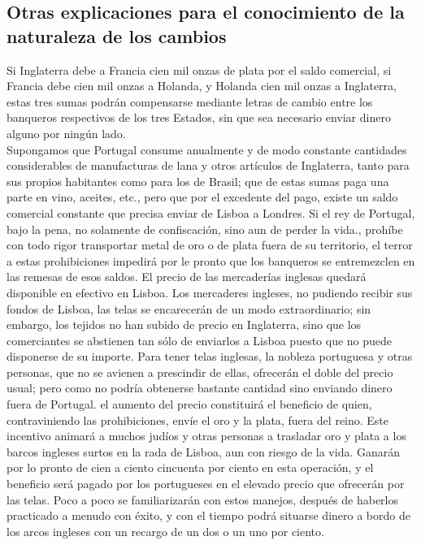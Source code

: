 \documentclass[10pt]{article}
\begin{document}
\begin{multicols}{1}
\section*{Otras explicaciones para el conocimiento de la naturaleza de los cambios}
Si Inglaterra debe a Francia cien mil onzas de plata por el saldo comercial, si Francia debe cien mil onzas a Holanda, y Holanda cien mil onzas a Inglaterra, estas tres sumas podrán compensarse mediante letras de cambio entre los banqueros respectivos de los tres Estados, sin que sea necesario enviar dinero alguno por ningún lado.\\
Supongamos que Portugal consume anualmente y de modo constante cantidades considerables de manufacturas de lana y otros artículos de Inglaterra, tanto para sus propios habitantes como para los de Brasil; que de estas sumas paga una parte en vino, aceites, etc., pero que por el excedente del pago, existe un saldo comercial constante que precisa enviar de Lisboa a Londres. Si el rey de Portugal, bajo la pena, no solamente de confiscación, sino aun de perder la vida., prohíbe con todo rigor transportar metal de oro o de plata fuera de su territorio, el terror a estas prohibiciones impedirá por le pronto que los banqueros se
entremezclen en las remesas de esos saldos. El precio de las mercaderías inglesas quedará disponible en
efectivo en Lisboa. Los mercaderes ingleses, no pudiendo recibir sus fondos de Lisboa, las telas se encarecerán de un modo extraordinario; sin embargo, los tejidos no han subido de precio en Inglaterra, sino que los comerciantes se abstienen tan sólo de enviarlos a Lisboa puesto que no puede disponerse de su importe. Para tener telas inglesas, la nobleza portuguesa y otras personas, que no se avienen a prescindir de ellas, ofrecerán el doble del precio usual; pero como no podría obtenerse bastante cantidad sino enviando dinero fuera de Portugal. el aumento del precio constituirá el beneficio de quien, contraviniendo las prohibiciones, envíe el oro y la plata, fuera del reino. Este incentivo animará a muchos judíos y otras personas a trasladar oro y plata a los barcos ingleses surtos en la rada de Lisboa, aun con riesgo de la vida. Ganarán por lo pronto de cien a ciento cincuenta por ciento en esta operación, y el beneficio será pagado por los portugueses en el elevado precio que ofrecerán por las telas. Poco a poco se familiarizarán con estos manejos, después de haberlos practicado a menudo con éxito, y con el tiempo podrá situarse dinero a bordo de los arcos ingleses con un recargo de un dos o un uno por ciento.\\

\end{multicols}
\end{document}
